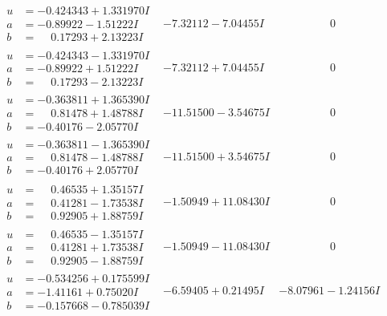 \documentclass[1p]{elsarticle_modified}
\theoremstyle{definition}
\begin{document}
$$\begin{array}{c|c|c}
\begin{aligned}
u &= -0.424343 + 1.331970 I \\
a &= -0.89922 - 1.51222 I \\
b &= \phantom{-}0.17293 + 2.13223 I\end{aligned}
 & -7.32112 - 7.04455 I & \phantom{-0.000000 } 0 \\ \hline\begin{aligned}
u &= -0.424343 - 1.331970 I \\
a &= -0.89922 + 1.51222 I \\
b &= \phantom{-}0.17293 - 2.13223 I\end{aligned}
 & -7.32112 + 7.04455 I & \phantom{-0.000000 } 0 \\ \hline\begin{aligned}
u &= -0.363811 + 1.365390 I \\
a &= \phantom{-}0.81478 + 1.48788 I \\
b &= -0.40176 - 2.05770 I\end{aligned}
 & -11.51500 - 3.54675 I & \phantom{-0.000000 } 0 \\ \hline\begin{aligned}
u &= -0.363811 - 1.365390 I \\
a &= \phantom{-}0.81478 - 1.48788 I \\
b &= -0.40176 + 2.05770 I\end{aligned}
 & -11.51500 + 3.54675 I & \phantom{-0.000000 } 0 \\ \hline\begin{aligned}
u &= \phantom{-}0.46535 + 1.35157 I \\
a &= \phantom{-}0.41281 - 1.73538 I \\
b &= \phantom{-}0.92905 + 1.88759 I\end{aligned}
 & -1.50949 + 11.08430 I & \phantom{-0.000000 } 0 \\ \hline\begin{aligned}
u &= \phantom{-}0.46535 - 1.35157 I \\
a &= \phantom{-}0.41281 + 1.73538 I \\
b &= \phantom{-}0.92905 - 1.88759 I\end{aligned}
 & -1.50949 - 11.08430 I & \phantom{-0.000000 } 0 \\ \hline\begin{aligned}
u &= -0.534256 + 0.175599 I \\
a &= -1.41161 + 0.75020 I \\
b &= -0.157668 - 0.785039 I\end{aligned}
 & -6.59405 + 0.21495 I & -8.07961 - 1.24156 I \\ \hline\begin{aligned}

\end{aligned}
\end{array}$$
\end{document}
